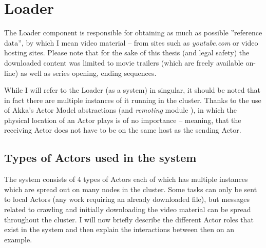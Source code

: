 \section{Loader}
The Loader component is responsible for obtaining as much as possible ''reference data'', by which I mean video material -- from sites such as \textit{youtube.com} or video hosting sites. Please note that for the sake of this thesis (and legal safety) the downloaded content was limited to movie trailers (which are freely available on-line) as well as series opening, ending sequences.

While I will refer to the Loader (as a system) in singular, it should be noted that in fact there are multiple instances of it running in the cluster.
Thanks to the use of Akka's \cite{akka-docs} Actor Model abstractions (and \textit{remoting} module \cite{akka-remoting}), in which the physical location of an Actor plays is of no importance -- meaning, that the receiving Actor does not have to be on the same host as the sending Actor.

\subsection{Types of Actors used in the system}
\label{sec:types-of-actors}

The system consists of 4 types of Actors each of which has multiple instances which are spread out on many nodes in the cluster.
Some tasks can only be sent to local Actors (any work requiring an already downloaded file), but messages related to crawling and initially downloading
the video material can be spread throughout the cluster. I will now briefly describe the different Actor roles that exist in the system and then explain the interactions between then on an example.

